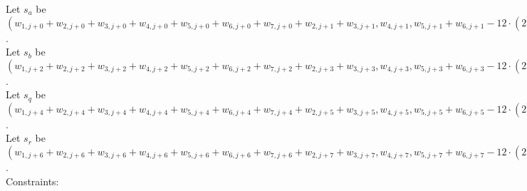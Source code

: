 Let $s_a$  be $(w_{1, j + 0} + w_{2, j + 0} + w_{3, j + 0} + w_{4, j + 0} + w_{5, j + 0} + w_{6, j + 0} + w_{7, j + 0} + w_{2, j + 1} + w_{3, j + 1}, w_{4, j + 1}, w_{5, j + 1} + w_{6, j + 1} - 12 \cdot (2^20 - 1))$. \\
Let $s_b$  be $(w_{1, j + 2} + w_{2, j + 2} + w_{3, j + 2} + w_{4, j + 2} + w_{5, j + 2} + w_{6, j + 2} + w_{7, j + 2} + w_{2, j + 3} + w_{3, j + 3}, w_{4, j + 3}, w_{5, j + 3} + w_{6, j + 3} - 12 \cdot (2^20 - 1))$. \\
Let $s_q$  be $(w_{1, j + 4} + w_{2, j + 4} + w_{3, j + 4} + w_{4, j + 4} + w_{5, j + 4} + w_{6, j + 4} + w_{7, j + 4} + w_{2, j + 5} + w_{3, j + 5}, w_{4, j + 5}, w_{5, j + 5} + w_{6, j + 5} - 12 \cdot (2^20 - 1))$. \\
Let $s_r$  be $(w_{1, j + 6} + w_{2, j + 6} + w_{3, j + 6} + w_{4, j + 6} + w_{5, j + 6} + w_{6, j + 6} + w_{7, j + 6} + w_{2, j + 7} + w_{3, j + 7}, w_{4, j + 7}, w_{5, j + 7} + w_{6, j + 7} - 12 \cdot (2^20 - 1))$. \\
Constraints:
